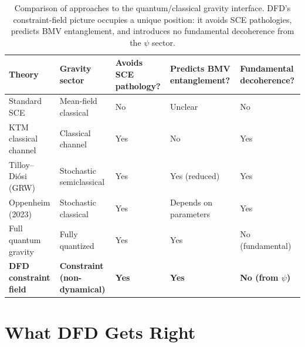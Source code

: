 \documentclass[12pt,a4paper]{article}
\begin{document}
\begin{table}[htbp]
\centering
\small
\begin{tabular}{@{}p{3.2cm}p{2.8cm}p{2.8cm}p{2.8cm}p{2.5cm}@{}}
\toprule
\textbf{Theory} & \textbf{Gravity sector} & \textbf{Avoids SCE pathology?} & \textbf{Predicts BMV entanglement?} & \textbf{Fundamental decoherence?} \\
\midrule
Standard SCE & Mean-field classical & No & Unclear & No \\
KTM classical channel & Classical channel & Yes & No & Yes \\
Tilloy--Di\'osi (GRW) & Stochastic semiclassical & Yes & Yes (reduced) & Yes \\
Oppenheim (2023) & Stochastic classical & Yes & Depends on parameters & Yes \\
Full quantum gravity & Fully quantized & Yes & Yes & No (fundamental) \\
\textbf{DFD constraint field} & \textbf{Constraint (non-dynamical)} & \textbf{Yes} & \textbf{Yes} & \textbf{No (from $\psi$)} \\
\bottomrule
\end{tabular}
\caption{Comparison of approaches to the quantum/classical gravity interface. DFD's constraint-field picture occupies a unique position: it avoids SCE pathologies, predicts BMV entanglement, and introduces no fundamental decoherence from the $\psi$ sector.}
\label{tab:comparison}
\end{table}


\section{What DFD Gets Right}
\label{sec:dfd-strengths}
\end{document}
